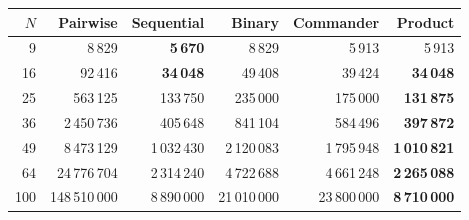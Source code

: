 \begin{tabular}{rrrrrr}
\toprule
$N$ & Pairwise & Sequential & Binary & Commander & Product \\
\midrule
9 & 8\,829 & \textbf{5\,670} & 8\,829 & 5\,913 & 5\,913 \\
16 & 92\,416 & \textbf{34\,048} & 49\,408 & 39\,424 & \textbf{34\,048} \\
25 & 563\,125 & 133\,750 & 235\,000 & 175\,000 & \textbf{131\,875} \\
36 & 2\,450\,736 & 405\,648 & 841\,104 & 584\,496 & \textbf{397\,872} \\
49 & 8\,473\,129 & 1\,032\,430 & 2\,120\,083 & 1\,795\,948 & \textbf{1\,010\,821} \\
64 & 24\,776\,704 & 2\,314\,240 & 4\,722\,688 & 4\,661\,248 & \textbf{2\,265\,088} \\
100 & 148\,510\,000 & 8\,890\,000 & 21\,010\,000 & 23\,800\,000 & \textbf{8\,710\,000} \\
\bottomrule
\end{tabular}
